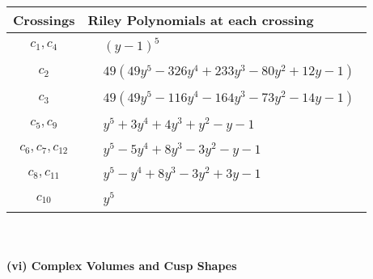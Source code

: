 \documentclass[1p]{elsarticle_modified}
\theoremstyle{definition}
\begin{document}
\begin{tabular}{m{50pt}|m{274pt}}
Crossings & \hspace{64pt}Riley Polynomials at each crossing \\
\hline $$\begin{aligned}c_{1},c_{4}\end{aligned}$$&$\begin{aligned}
&(y-1)^5
\end{aligned}$\\
\hline $$\begin{aligned}c_{2}\end{aligned}$$&$\begin{aligned}
&49(49 y^5-326 y^4+233 y^3-80 y^2+12 y-1)
\end{aligned}$\\
\hline $$\begin{aligned}c_{3}\end{aligned}$$&$\begin{aligned}
&49(49 y^5-116 y^4-164 y^3-73 y^2-14 y-1)
\end{aligned}$\\
\hline $$\begin{aligned}c_{5},c_{9}\end{aligned}$$&$\begin{aligned}
&y^5+3 y^4+4 y^3+y^2- y-1
\end{aligned}$\\
\hline $$\begin{aligned}c_{6},c_{7},c_{12}\end{aligned}$$&$\begin{aligned}
&y^5-5 y^4+8 y^3-3 y^2- y-1
\end{aligned}$\\
\hline $$\begin{aligned}c_{8},c_{11}\end{aligned}$$&$\begin{aligned}
&y^5- y^4+8 y^3-3 y^2+3 y-1
\end{aligned}$\\
\hline $$\begin{aligned}c_{10}\end{aligned}$$&$\begin{aligned}
&y^5
\end{aligned}$\\
\hline
\end{tabular}\\~\\
\newpage\flushleft \textbf{(vi) Complex Volumes and Cusp Shapes}
\end{document}
